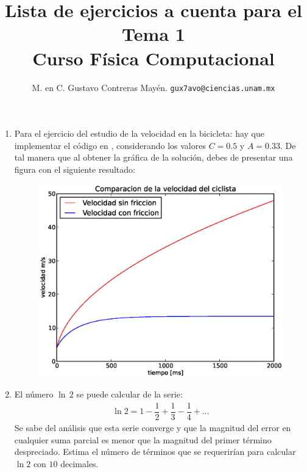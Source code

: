 
\usepackage{minted}

\author{M. en C. Gustavo Contreras Mayén. \texttt{gux7avo@ciencias.unam.mx}}
\title{Lista de ejercicios a cuenta para el Tema 1 \\ {\large Curso Física Computacional}}
\date{ }


\maketitle
\fontsize{14}{14}\selectfont

\begin{enumerate}
\item Para el ejercicio del estudio de la velocidad en la bicicleta: hay que implementar el código en \python, considerando los valores $C = 0.5$ y $A=0.33$. De tal manera que al obtener la gráfica de la solución, debes de presentar una figura con el siguiente resultado:
\begin{figure}[H]
	\centering
	\includegraphics[scale=0.475]{Imagenes/EjerBicicleta02.eps}
\end{figure}
\item El número $\ln \, 2$ se puede calcular de la serie:
\begin{align*}
\ln 2 = 1 - \dfrac{1}{2} + \dfrac{1}{3} -\dfrac{1}{4} + \ldots
\end{align*}
Se sabe del análisis que esta serie converge y que la magnitud del error en cualquier suma parcial es menor que la magnitud del primer término despreciado. Estima el número de términos que se requerirían para calcular $\ln 2$ con $10$ decimales.

\end{enumerate}
